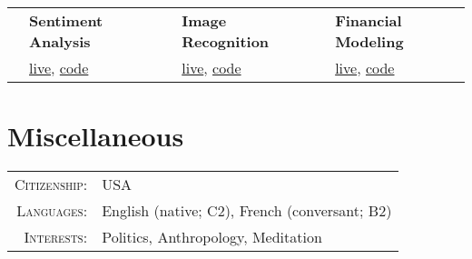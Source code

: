 \documentclass{article}
\begin{document}
	\begin{tabular}{r p{4cm} r p{4cm} r p{4cm} }
	
		\multirow{2}{*}{\Huge \color{starcolor}{\faSmileO}} &
		\textbf{Sentiment Analysis} & 
		\multirow{2}{*}{\Huge \color{starcolor}{\faPictureO}} &
		\textbf{Image Recognition} &
		\multirow{2}{*}{\Huge \color{starcolor}{\faLineChart }} &
		\textbf{Financial Modeling}\\
		
		&
		\href{https://sentiment.erickramer.live}{live}, \href{https://github.com/erickramer/sentiment}{code} & &
		\href{https://image.erickramer.live}{live}, \href{https://github.com/erickramer/image_recog}{code} & &
		\href{https://eransom.shinyapps.io/financial_planning/}{live}, \href{https://github.com/erickramer/financial_dashboard}{code} \\	

		
	\end{tabular}

\section{Miscellaneous}

	\begin{tabular}{r l}
		\textsc{Citizenship}: & USA \\
		\textsc{Languages}: &  English (native; C2), French (conversant; B2)\\
		\textsc{Interests}: & Politics, Anthropology, Meditation
	\end{tabular}
\end{document}
